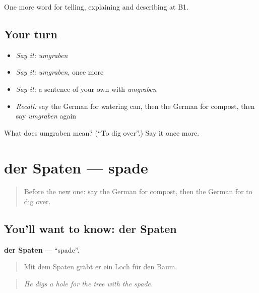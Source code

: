 \begin{grammarlens}[title={What you've built}]
One more word for telling, explaining and describing at B1.
\end{grammarlens}

\subsection*{Your turn}
\begin{itemize}
\raggedright
  \item \emph{Say it:} \emph{umgraben}
  \item \emph{Say it:} \emph{umgraben}, once more
  \item \emph{Say it:} a sentence of your own with \emph{umgraben}
  \item \emph{Recall:} say the German for watering can, then the German for compost, then say \emph{umgraben} again
\end{itemize}

\begin{tcolorbox}[breakable,colback=teal!4,colframe=teal!35!black,title={Before you move on}]
What does umgraben mean? (\textquotedblleft{}To dig over\textquotedblright{}.) Say it once more.
\end{tcolorbox}
\section[der Spaten]{der Spaten — spade}

\label{lesson:GE-C504-spaten}



\begin{quote}
Before the new one: say the German for compost, then the German for to dig over.
\end{quote}

\subsection*{You'll want to know: der Spaten}
\textbf{der Spaten} — \textquotedblleft{}spade\textquotedblright{}.

\begin{quote}
Mit dem Spaten gräbt er ein Loch für den Baum.
\end{quote}

\begin{quote}
\emph{He digs a hole for the tree with the spade.}
\end{quote}

